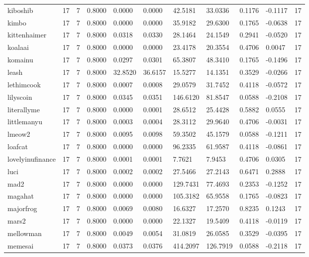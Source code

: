 \begin{table}[htbp]
\begin{tabular}{lllllllllll}
kiboshib & 17 & 7 & 0.8000 & 0.0000 & 0.0000 & 42.5181 & 33.0336 & 0.1176 & -0.1117 & 17 \\
kimbo & 17 & 7 & 0.8000 & 0.0000 & 0.0000 & 35.9182 & 29.6300 & 0.1765 & -0.0638 & 17 \\
kittenhaimer & 17 & 7 & 0.8000 & 0.0318 & 0.0330 & 28.1464 & 24.1549 & 0.2941 & -0.0520 & 17 \\
koalaai & 17 & 7 & 0.8000 & 0.0000 & 0.0000 & 23.4178 & 20.3554 & 0.4706 & 0.0047 & 17 \\
komainu & 17 & 7 & 0.8000 & 0.0297 & 0.0301 & 65.3807 & 48.3410 & 0.1765 & -0.1496 & 17 \\
leash & 17 & 7 & 0.8000 & 32.8520 & 36.6157 & 15.5277 & 14.1351 & 0.3529 & -0.0266 & 17 \\
lethimcook & 17 & 7 & 0.8000 & 0.0007 & 0.0008 & 29.0579 & 31.7452 & 0.4118 & -0.0572 & 17 \\
lilyscoin & 17 & 7 & 0.8000 & 0.0345 & 0.0351 & 146.6120 & 81.8547 & 0.0588 & -0.2108 & 17 \\
literallyme & 17 & 7 & 0.8000 & 0.0000 & 0.0001 & 28.6512 & 25.4428 & 0.5882 & 0.0555 & 17 \\
littlemanyu & 17 & 7 & 0.8000 & 0.0003 & 0.0004 & 28.3112 & 29.9640 & 0.4706 & -0.0031 & 17 \\
lmeow2 & 17 & 7 & 0.8000 & 0.0095 & 0.0098 & 59.3502 & 45.1579 & 0.0588 & -0.1211 & 17 \\
loafcat & 17 & 7 & 0.8000 & 0.0000 & 0.0000 & 96.2335 & 61.9587 & 0.4118 & -0.0861 & 17 \\
lovelyinufinance & 17 & 7 & 0.8000 & 0.0001 & 0.0001 & 7.7621 & 7.9453 & 0.4706 & 0.0305 & 17 \\
luci & 17 & 7 & 0.8000 & 0.0002 & 0.0002 & 27.5466 & 27.2143 & 0.6471 & 0.2888 & 17 \\
mad2 & 17 & 7 & 0.8000 & 0.0000 & 0.0000 & 129.7431 & 77.4693 & 0.2353 & -0.1252 & 17 \\
magahat & 17 & 7 & 0.8000 & 0.0000 & 0.0000 & 105.3182 & 65.9558 & 0.1765 & -0.0823 & 17 \\
majorfrog & 17 & 7 & 0.8000 & 0.0069 & 0.0080 & 16.6327 & 17.2570 & 0.8235 & 0.1243 & 17 \\
mars2 & 17 & 7 & 0.8000 & 0.0000 & 0.0000 & 22.1327 & 19.5409 & 0.4118 & -0.0119 & 17 \\
mellowman & 17 & 7 & 0.8000 & 0.0049 & 0.0054 & 31.0819 & 26.0585 & 0.3529 & -0.0395 & 17 \\
memesai & 17 & 7 & 0.8000 & 0.0373 & 0.0376 & 414.2097 & 126.7919 & 0.0588 & -0.2118 & 17 \\

\end{tabular}
\end{table}
